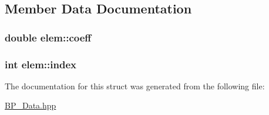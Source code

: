 \subsection{Member Data Documentation}
\hypertarget{structelem_a77cd8f9c50b93d8b253a5dfdc3256691}{
\subsubsection[{coeff}]{\setlength{\rightskip}{0pt plus 5cm}double elem\-::coeff}}\label{structelem_a77cd8f9c50b93d8b253a5dfdc3256691}
\hypertarget{structelem_a029ce64c0d1390a2d94a5aa5623da358}{
\subsubsection[{index}]{\setlength{\rightskip}{0pt plus 5cm}int elem\-::index}}\label{structelem_a029ce64c0d1390a2d94a5aa5623da358}


The documentation for this struct was generated from the following file\-:\begin{DoxyCompactItemize}
\item 
\hyperlink{_b_p___data_8hpp}{B\-P\-\_\-\-Data.\-hpp}\end{DoxyCompactItemize}

